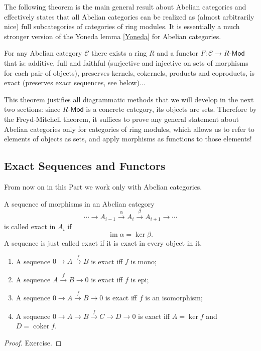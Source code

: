 \documentclass[english,letterpaper]{article}%
\numberwithin{equation}{section}
\numberwithin{figure}{section}
\numberwithin{table}{section}
\theoremstyle{definition}
\theoremstyle{definition}
\theoremstyle{definition}
\theoremstyle{plain}
\theoremstyle{plain}
\theoremstyle{plain}
\theoremstyle{plain}
\theoremstyle{remark}
\theoremstyle{remark}
\newcommand{\calC}{\mathcal{C}}
\DeclareMathOperator{\im}{im}
\DeclareMathOperator{\coker}{coker}
\begin{document}
The following theorem is the main general result about Abelian categories and effectively states that all Abelian categories can be realized as (almost arbitrarily nice) full subcategories of categories of ring modules. It is essentially a much stronger version of the Yoneda lemma \ref{Yoneda} for Abelian categories.

\begin{thm}
    For any Abelian category $\calC$ there exists a ring $R$ and a functor $F:\calC\to R\text{-}\mathsf{Mod}$ that is: additive, full and faithful (surjective and injective on sets of morphisms for each pair of objects), preserves kernels, cokernels, products and coproducts, is exact (preserves exact sequences, see below)...
\end{thm}
This theorem justifies all diagrammatic methods that we will develop in the next two sections: since $R\text{-}\mathsf{Mod}$ is a concrete category, its objects are sets. Therefore by the Freyd-Mitchell theorem, it suffices to prove any general statement about Abelian categories only for categories of ring modules, which allows us to refer to elements of objects as sets, and apply morphisms as functions to those elements!


\subsection{Exact Sequences and Functors}

From now on in this Part we work only with Abelian categories.
\begin{defn}
 A sequence of morphisms in an Abelian category 
 \[\cdots \to A_{i-1}\overset{\alpha}\to A_i\overset{\beta}\to A_{i+1}\to \cdots\]
 is called exact in $A_i$ if 
 \[\im\alpha=\ker\beta.\]
 A sequence is just called exact if it is exact in every object in it.
\end{defn}

\begin{prop}
    \begin{enumerate}
        \item A sequence $0\to A\overset f\to B$ is exact iff $f$ is mono;
        \item A sequence $A\overset f\to B\to 0$ is exact iff $f$ is epi;
        \item A sequence $0\to A\overset f\to B\to 0$ is exact iff $f$ is an isomorphism;
        \item A sequence $0\to A\to B\overset f\to C\to D\to 0$ is exact iff $A=\ker f$ and $D=\coker f$.
    \end{enumerate}
\end{prop}
\begin{proof}
    Exercise.
\end{proof}
\end{document}
